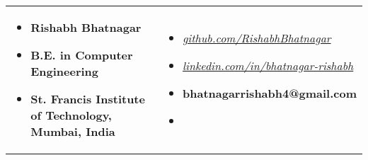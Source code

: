 \begin{table}[h!]
    \begin{center}
        \begin{tabular}{p{10cm}  p{9cm}}
            \begin{itemize}
                \setlength\itemsep{.01em}
                \item[] \textbf{Rishabh Bhatnagar}
                \item[] \textbf{B.E. in Computer Engineering}
                \item[] \textbf{St. Francis Institute of Technology, Mumbai, India}
            \end{itemize}
            &
            \begin{itemize}
                \setlength\itemsep{.01em}
                \item[] \href{https://www.github.com/RishabhBhatnagar}{\textit{github.com/RishabhBhatnagar}}
                \item[] \href{https://www.linkedin.com/in/bhatnagar-rishabh}{\textit{linkedin.com/in/bhatnagar-rishabh}}
                \item[] \textbf{bhatnagarrishabh4@gmail.com}
                \item[] \textbf{}
            \end{itemize}
        \end{tabular}
    \end{center}
\end{table}

\vspace{-1.5cm}